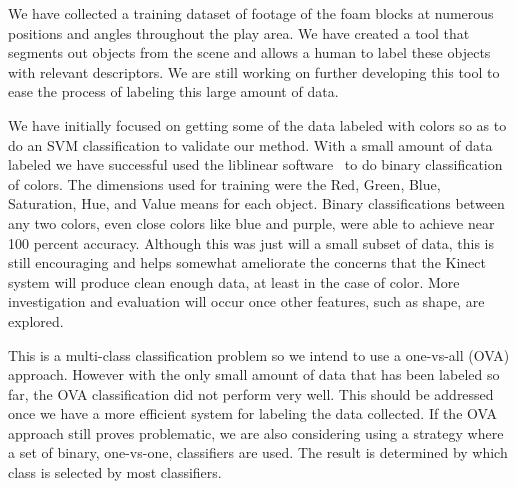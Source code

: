 \documentclass[11pt]{article}
\begin{document}
We have collected a training dataset of footage of the foam blocks at numerous
positions and angles throughout the play area. We have created a tool that
segments out objects from the scene and allows a human to label these objects
with relevant descriptors.  We are still working on further developing this
tool to ease the process of labeling this large amount of data.


We have initially focused on getting some of the data labeled with colors so as
to do an SVM classification to validate our method.  With a small amount of
data labeled we have successful used the liblinear software~\cite{LIBLINEAR} to do
binary classification of colors.  The dimensions used for training were the
Red, Green, Blue, Saturation, Hue, and Value means for each object.  Binary
classifications between any two colors, even close colors like blue and purple,
were able to achieve near 100 percent accuracy.  Although this was just will a
small subset of data, this is still encouraging and helps somewhat ameliorate
the concerns that the Kinect system will produce clean enough data, at least in
the case of color.  More investigation and evaluation will occur once other
features, such as shape, are explored.

This is a multi-class classification problem so we intend to use a one-vs-all
(OVA) approach.  However with the only small amount of data that has been
labeled so far, the OVA classification did not perform very well.  This should
be addressed once we have a more efficient system for labeling the data
collected.  If the OVA approach still proves problematic, we are also
considering using a strategy where a set of binary, one-vs-one, classifiers are
used.  The result is determined by which class is selected by most classifiers.
\end{document}
